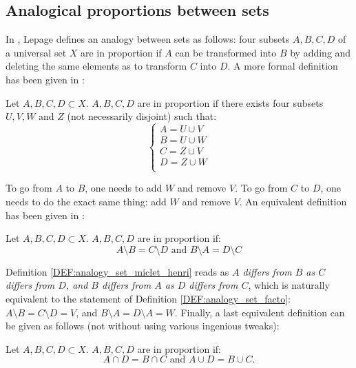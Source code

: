\subsection{Analogical proportions between sets}

In \cite{Lep03}, Lepage defines an analogy between sets as follows: four subsets
$A, B, C, D$ of a universal set $X$ are in proportion if $A$ can be transformed
into $B$ by adding and deleting the same elements as to transform $C$ into $D$.
A more formal definition has been given in \cite{StrYvoREPORT05}:

\begin{definition}
  \label{DEF:analogy_set_facto}
  Let $A, B, C, D \subset X$. $A, B, C, D$ are in proportion if there exists
  four subsets $U, V, W$ and $Z$ (not necessarily disjoint) such that:
  $$
  \begin{cases}
    A = U \cup V\\
    B = U \cup W\\
    C = Z \cup V\\
    D = Z \cup W\\
  \end{cases}
  $$
\end{definition}

To go from $A$ to $B$, one needs to add $W$ and remove $V$. To go from $C$ to
$D$, one needs to do the exact same thing: add $W$ and remove $V$. An
equivalent definition has been given in \cite{MicPra09}:

\begin{definition}
  \label{DEF:analogy_set_miclet_henri}
  Let $A, B, C, D \subset X$. $A, B, C, D$ are in proportion if:
  $$
  A \setminus B = C \setminus D \text{ and } B \setminus A = D \setminus C
  $$
\end{definition}

Definition \ref{DEF:analogy_set_miclet_henri} reads as \textit{$A$ differs from
$B$ as $C$ differs from $D$, and $B$ differs from $A$ as $D$ differs from $C$},
which is naturally equivalent to the statement of Definition
\ref{DEF:analogy_set_facto}: $A \setminus B = C \setminus D = V$, and $B
\setminus A = D \setminus A  = W$.  Finally, a last equivalent definition can
be given as follows (not without using various ingenious tweaks):

\begin{definition}
  \label{DEF:yet_other_equiv_def}
  Let $A, B, C, D \subset X$. $A, B, C, D$ are in proportion if:
  $$ A \cap D = B \cap C \text{ and } A \cup D = B \cup C.$$
\end{definition}

